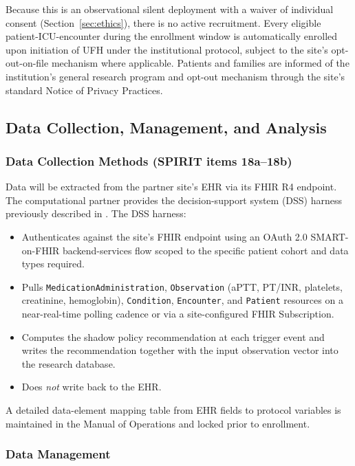 \documentclass[11pt]{article}
\begin{document}
Because this is an observational silent deployment with a waiver of individual consent (Section~\ref{sec:ethics}), there is no active recruitment. Every eligible patient-ICU-encounter during the enrollment window is automatically enrolled upon initiation of UFH under the institutional protocol, subject to the site's opt-out-on-file mechanism where applicable. Patients and families are informed of the institution's general research program and opt-out mechanism through the site's standard Notice of Privacy Practices.

\subsection{Data Collection, Management, and Analysis}
\label{sec:data}

\subsubsection{Data Collection Methods (SPIRIT items 18a--18b)}

Data will be extracted from the partner site's EHR via its FHIR R4 endpoint. The computational partner provides the decision-support system (DSS) harness previously described in \citep{hemosim2026}. The DSS harness:

\begin{itemize}
  \item Authenticates against the site's FHIR endpoint using an OAuth 2.0 SMART-on-FHIR backend-services flow scoped to the specific patient cohort and data types required.
  \item Pulls \texttt{MedicationAdministration}, \texttt{Observation} (aPTT, PT/INR, platelets, creatinine, hemoglobin), \texttt{Condition}, \texttt{Encounter}, and \texttt{Patient} resources on a near-real-time polling cadence or via a site-configured FHIR Subscription.
  \item Computes the shadow policy recommendation at each trigger event and writes the recommendation together with the input observation vector into the research database.
  \item Does \emph{not} write back to the EHR.
\end{itemize}

A detailed data-element mapping table from EHR fields to protocol variables is maintained in the Manual of Operations and locked prior to enrollment.

\subsubsection{Data Management}
\end{document}
